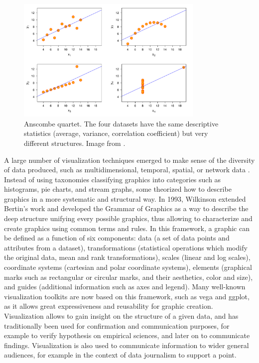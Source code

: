 \begin{figure}
    \centering %
    \includegraphics[width=0.8\textwidth]{static/figures/RelatedWork/Anscombe.pdf}
    \caption{Anscombe quartet. The four datasets have the same descriptive statistics (average, variance, correlation coefficient) but very different structures. Image from \cite{anscombeGraphsStatisticalAnalysis1973}.}
    \label{fig:anscombe-quartet}
\end{figure}

A large number of visualization techniques emerged to make sense of the diversity of data produced, such as multidimensional, temporal, spatial, or network data \cite{shneidermanEyesHaveIt1996}.
Instead of using taxonomies classifying graphics into categories such as histograms, pie charts, and stream graphs, some theorized how to describe graphics in a more systematic and structural way.
In 1993, Wilkinson extended Bertin's work and developed the Grammar of Graphics \cite{wilkinsonGrammarGraphics1993} as a way to describe the deep structure unifying every possible graphics, thus allowing to characterize and create graphics using common terms and rules.
In this framework, a graphic can be defined as a function of six components: data (a set of data points and attributes from a dataset), transformations (statistical operations which modify the original data, \eg mean and rank transformations), scales (\eg linear and log scales), coordinate systems (\eg cartesian and polar coordinate systems), elements (graphical marks such as rectangular or circular marks, and their aesthetics, \eg color and size), and guides (additional information such as axes and legend).
Many well-known visualization toolkits are now based on this framework, such as vega and ggplot, as it allows great expressiveness and reusability for graphic creation.
Visualization allows to gain insight on the structure of a given data, and has traditionally been used for confirmation and communication purposes, for example to verify hypothesis on empirical sciences, and later on to communicate findings.
Visualization is also used to communicate information to wider general audiences, for example in the context of data journalism to support a point.


